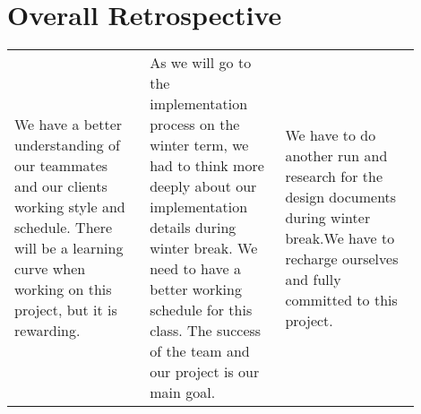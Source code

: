 \documentclass[letterpaper,10pt,onecolumn]{IEEEtran}
\begin{document}
\section{Overall Retrospective}
\hfill
\begin{center}
\begin{tabular}{|p{0.3\linewidth}|p{0.3\linewidth}|p{0.3\linewidth}|} 
\hline
	\centering{\textbf{Postive}} & \centering{\textbf{Deltas}} & \centering{\textbf{Action}} \tabularnewline
	\hline
	We have a better understanding of our teammates and our clients working style and schedule. There will be a learning curve when working on this project, but it is rewarding. &
	As we will go to the implementation process on the winter term, we had to think more deeply about our implementation details during winter break. We need to have a better working schedule for this class. The success of the team and our project is our main goal. &
	We have to do another run and research for the design documents during winter break.We have to recharge ourselves and fully committed to this project. \\
\hline	
\end{tabular}
\end{center}

\newpage
\nocite{*}


\end{document}

